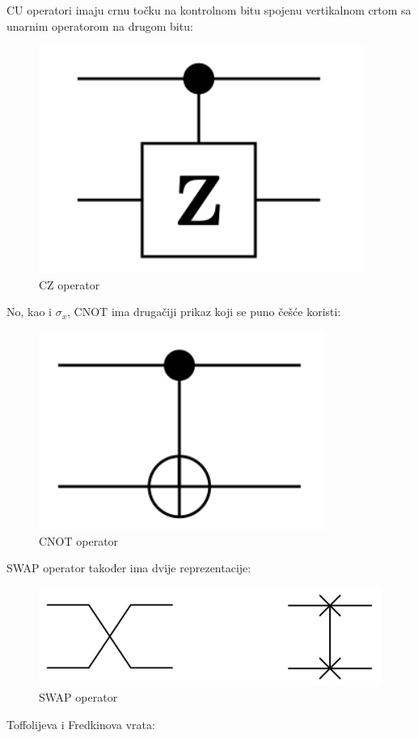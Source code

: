 CU operatori imaju crnu točku na kontrolnom bitu spojenu vertikalnom crtom sa unarnim operatorom na drugom bitu:
\begin{figure}[H]
\centering
\includegraphics[scale=0.3]{img/CZ.png}
\caption{CZ operator} 
\end{figure}
No, kao i $\sigma_x$, CNOT ima drugačiji prikaz koji se puno češće koristi:
\begin{figure}[H]
\centering
\includegraphics[scale=0.3]{img/CNOT.png}
\caption{CNOT operator} 
\end{figure}
SWAP operator također ima dvije reprezentacije:
\begin{figure}[H]
\centering
\includegraphics[scale=0.35]{img/SWAP.png}
\caption{SWAP operator} 
\end{figure}
Toffolijeva i Fredkinova vrata:
